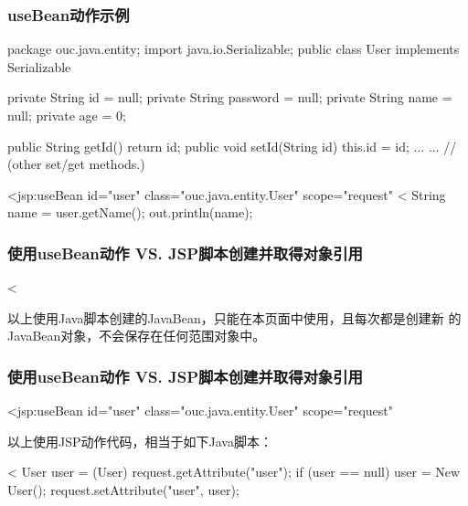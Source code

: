 \begin{frame}[fragile] %
  \frametitle{useBean动作示例} 


  \begin{javaCode}
    package ouc.java.entity;
    import java.io.Serializable;  
    public class User implements Serializable {
      private String id = null;
      private String password = null;
      private String name = null;
      private age = 0;

      public String getId() {
        return id;
      }
      public void setId(String id) {
        this.id = id;
      }
      ... ... // (other set/get methods.)
    }
  \end{javaCode}

  
  \begin{jspCode}
    <jsp:useBean id="user" class="ouc.java.entity.User" scope="request" \>
    <%
      String name = user.getName();
      out.println(name);
  \end{jspCode}
\end{frame}

\begin{frame}[fragile] %
  \frametitle{使用useBean动作 VS. JSP脚本创建并取得对象引用} 

  
  \begin{jspCode}
    <%
  \end{jspCode}


  以上使用Java脚本创建的JavaBean，只能在本页面中使用，且每次都是创建新
  的JavaBean对象，不会保存在任何范围对象中。

\end{frame}

\begin{frame}[fragile] %
  \frametitle{使用useBean动作 VS. JSP脚本创建并取得对象引用} 

  
  \begin{jspCode}
    <jsp:useBean id="user" class="ouc.java.entity.User" scope="request" \>
  \end{jspCode}

  以上使用JSP动作代码，相当于如下Java脚本：

  \begin{jspCode}
    <%
      User user = (User) request.getAttribute("user");
      if (user == null) {
        user = New User();
        request.setAttribute("user", user);
      }
  \end{jspCode}
\end{frame}

